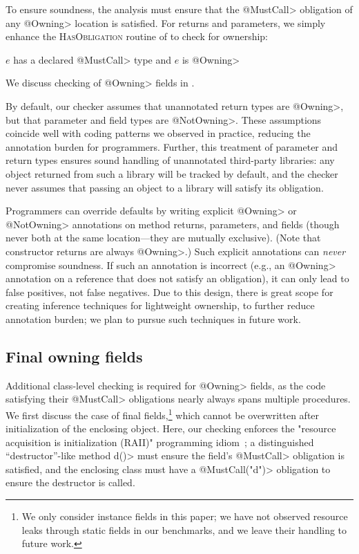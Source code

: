 To ensure soundness, the analysis must ensure that the \<@MustCall> obligation
of any \<@Owning> location is satisfied.  For returns and parameters, we simply
enhance the \textsc{HasObligation} routine of  to check for
ownership:
\begin{algorithmic}
  \State \Return $e$ has a declared \<@MustCall> type and $e$ is \<@Owning>
  \EndProcedure
\end{algorithmic}
We discuss checking of \<@Owning> fields in .  

By default, our checker assumes that unannotated return types are \<@Owning>,
but that parameter and field types are \<@NotOwning>.  These assumptions
coincide well with coding patterns we observed in practice, reducing the
annotation burden for programmers.  Further, this treatment of parameter and
return types ensures sound handling of unannotated third-party libraries: any
object returned from such a library will be tracked by default, and the checker
never assumes that passing an object to a library will satisfy its obligation.

Programmers can override defaults by writing explicit \<@Owning> or
\<@NotOwning> annotations on method returns, parameters, and fields (though never both at the same
location---they are mutually exclusive).  (Note that constructor returns are always
\<@Owning>.)  Such explicit annotations can
\emph{never} compromise soundness.  If such an annotation is incorrect (e.g., an
\<@Owning> annotation on a reference that does not satisfy an obligation), it
can only lead to false positives, not false negatives.  Due to this design,
there is great scope for creating inference techniques for lightweight
ownership, to further reduce annotation burden; we plan to pursue such
techniques in future work.


\subsection{Final owning fields}
\label{sec:owning-fields}

  Additional class-level checking is required for \<@Owning> fields, as the code
  satisfying their \<@MustCall> obligations nearly always spans multiple
  procedures.  We first discuss the case of final fields,\footnote{We only
  consider instance fields in this paper; we have not observed resource leaks
  through static fields in our benchmarks, and we leave their handling to future
  work.} which cannot be overwritten after initialization of the enclosing
  object.  Here, our checking enforces the "resource acquisition is
  initialization (RAII)" programming idiom~\cite{raii}; a distinguished
  ``destructor''-like method \<d()> must ensure the field's \<@MustCall> obligation is
  satisfied, and the enclosing class must have a \<@MustCall("d")> obligation to
  ensure the destructor is called.

